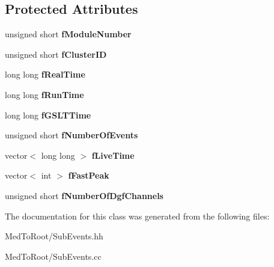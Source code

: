 \subsection*{Protected Attributes}
\begin{DoxyCompactItemize}
\item 
\mbox{\label{class_dgf_scaler_sub_event_a86dbc7481d266b668799d198807df991}} 
unsigned short {\bfseries f\+Module\+Number}
\item 
\mbox{\label{class_dgf_scaler_sub_event_a308d5787aeb511ce698e021d69fa8d46}} 
unsigned short {\bfseries f\+Cluster\+ID}
\item 
\mbox{\label{class_dgf_scaler_sub_event_aa459f724ff8a6621d2ce35bb8d9ac971}} 
long long {\bfseries f\+Real\+Time}
\item 
\mbox{\label{class_dgf_scaler_sub_event_a2d9ebb7063c5b6ad3beabedc58a2d4ef}} 
long long {\bfseries f\+Run\+Time}
\item 
\mbox{\label{class_dgf_scaler_sub_event_aa3de3cbc37314d07172d9899e9b2951b}} 
long long {\bfseries f\+G\+S\+L\+T\+Time}
\item 
\mbox{\label{class_dgf_scaler_sub_event_afbbc4fdf75ad471453e0bd8930286aae}} 
unsigned short {\bfseries f\+Number\+Of\+Events}
\item 
\mbox{\label{class_dgf_scaler_sub_event_a7433bbc94024bb171af20d2b98658686}} 
vector$<$ long long $>$ {\bfseries f\+Live\+Time}
\item 
\mbox{\label{class_dgf_scaler_sub_event_a5847eac857f67c4add3c15a7b2bb890d}} 
vector$<$ int $>$ {\bfseries f\+Fast\+Peak}
\item 
\mbox{\label{class_dgf_scaler_sub_event_a2deb4d871695699aac992b4179881137}} 
unsigned short {\bfseries f\+Number\+Of\+Dgf\+Channels}
\end{DoxyCompactItemize}


The documentation for this class was generated from the following files\+:\begin{DoxyCompactItemize}
\item 
Med\+To\+Root/Sub\+Events.\+hh\item 
Med\+To\+Root/Sub\+Events.\+cc\end{DoxyCompactItemize}
